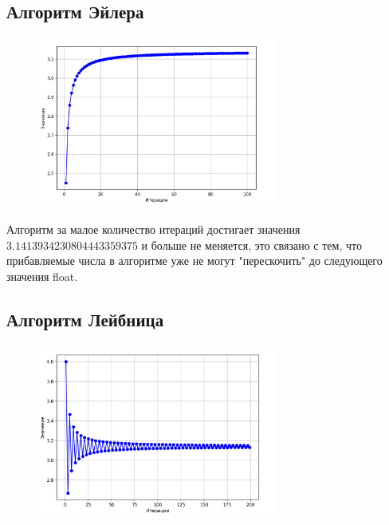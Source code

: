 \documentclass[a4paper,12pt]{article} %
\begin{document}
\subsection{Алгоритм Эйлера}

\begin{figure}[H]
    \centering
    \includegraphics[width=0.7\textwidth]{6.jpg}
\end{figure} 
Алгоритм за малое количество итераций достигает значения $3.1413934230804443359375$
и больше не меняется, это связано с тем, что прибавляемые числа в алгоритме уже не могут "перескочить" до следующего значения float.

\subsection{Алгоритм Лейбница}
\begin{figure}[H]
    \centering
    \includegraphics[width=0.7\textwidth]{7.jpg}
\end{figure} 
\end{document}
